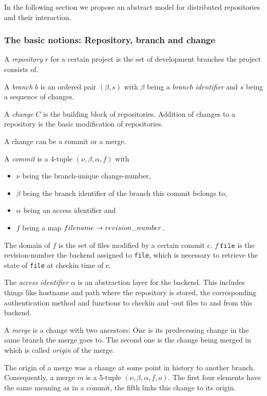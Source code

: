 \documentclass[fleqn, 10pt, a4paper]{report} \usepackage{amssymb}
\begin{document}
In the following section we propose an abstract model for distributed
repositories and their interaction.

\subsubsection{The basic notions: Repository, branch and change}

A \emph{repository} $r$ for a certain project is the set of
development branches the project consists of.

A \emph{branch} $b$ is an ordered pair $(\beta, s)$ with $\beta$ being
a \emph{branch identifier} and $s$ being a sequence of changes.

A \emph{change} $C$ is the building block of repositories.  Addition
of changes to a repository is the basic modification of repositories.

A change can be a commit or a merge.

A \emph{commit} is a 4-tuple $(\nu, \beta, \alpha, f)$ with
\begin{itemize}
\item $\nu$ being the branch-unique change-number,
\item $\beta$ being the branch identifier of the branch this commit
  belongs to,
\item $\alpha$ being an access identifier and
\item $f$ being a map $\mathnormal{filename} \rightarrow
  \mathnormal{revision\_number}$.
\end{itemize}

The domain of $f$ is the set of files modified by a certain commit
$c$. $f\ \mathtt{file}$ is the revision-number the backend assigned to
\texttt{file}, which is necessary to retrieve the state of
\texttt{file} at checkin time of $c$.

The \emph{access identifier} $\alpha$ is an abstraction layer for the
backend. This includes things like hostname and path where the
repository is stored, the corresponding authentication method and
functions to checkin and -out files to and from this backend.

A \emph{merge} is a change with two ancestors: One is its predecessing
change in the same branch the merge goes to. The second one is the
change being merged in which is called \emph{origin} of the merge.

The origin of a merge was a change at some point in history to another
branch. Consequently, a merge $m$ is a 5-tuple $(\nu, \beta, \alpha,
f, o)$. The first four elements have the same meaning as in a commit,
the fifth links this change to its origin.
\end{document}
